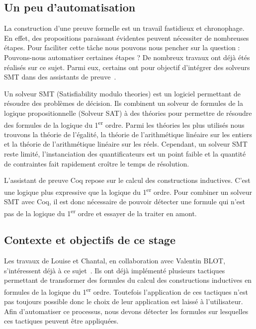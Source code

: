 \documentclass[titlepage,draft]{article}
\begin{document}
\subsection{Un peu d'automatisation}
La construction d'une preuve formelle est un travail fastidieux et chronophage. En effet, des propositions paraissant évidentes peuvent nécessiter de nombreuses étapes.
Pour faciliter cette tâche nous pouvons nous pencher sur la question : Pouvons-nous automatiser certaines étapes ? De nombreux travaux ont déjà étés réalisés sur ce sujet. Parmi eux, certains ont pour objectif d'intégrer des solveurs SMT dans des assistants de preuve~\cite{DBLP:conf/cpp/ArmandFGKTW11}.

Un solveur SMT (Satisfiability modulo theories) est un logiciel permettant de résoudre des problèmes de décision. Ils combinent un solveur de formules de la logique propositionnelle (Solveur SAT) à des théories pour permettre de résoudre des formules de la logique du 1\textsuperscript{er} ordre. Parmi les théories les plus utilisés nous trouvons la théorie de l'égalité, la théorie de l'arithmétique linéaire sur les entiers et la théorie de l'arithmétique linéaire sur les réels. Cependant, un solveur SMT reste limité, l'instanciation des quantificateurs est un point faible et la quantité de contraintes fait rapidement croître le temps de résolution.

L'assistant de preuve Coq repose sur le calcul des constructions inductives. C'est une logique plus expressive que la logique du 1\textsuperscript{er} ordre. Pour combiner un solveur SMT avec Coq, il est donc nécessaire de pouvoir détecter une formule qui n'est pas de la logique du 1\textsuperscript{er} ordre et essayer de la traiter en amont.


\subsection{Contexte et objectifs de ce stage}
Les travaux de Louise et Chantal, en collaboration avec Valentin BLOT, s'intéressent déjà à ce sujet~\cite{DBLP:journals/corr/abs-2107-02353,DBLP:journals/corr/abs-2204-02643,DBLP:conf/cpp/Blot0CPKMV23}. Ils ont déjà implémenté plusieurs tactiques permettant de transformer des formules du calcul des constructions inductives en formules de la logique du 1\textsuperscript{er} ordre. Toutefois l'application de ces tactiques n'est pas toujours possible donc le choix de leur application est laissé à l'utilisateur. Afin d'automatiser ce processus, nous devons détecter les formules sur lesquelles ces tactiques peuvent être appliquées.
\end{document}
